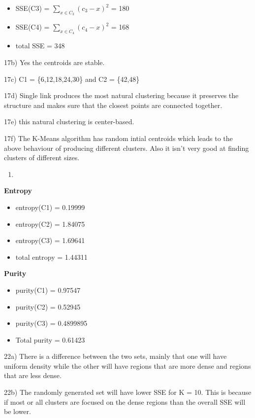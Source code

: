 \documentclass[11pt]{article}
\begin{document}
\begin{itemize}
\item
  SSE(C3) = \(\sum_{x\in C_3} (c_3 - x)^2\) = 180
\item
  SSE(C4) = \(\sum_{x\in C_4} (c_4 - x)^2\) = 168
\item
  total SSE = 348
\end{itemize}

17b) Yes the centroids are stable.

17c) C1 = \{6,12,18,24,30\} and C2 = \{42,48\}

17d) Single link produces the most natural clustering because it
preserves the structure and makes sure that the closest points are
connected together.

17e) this natural clustering is center-based.

17f) The K-Means algorithm has random intial centroids which leads to
the above behaviour of producing different clusters. Also it isn't very
good at finding clusters of different sizes.

\begin{enumerate}
\def\labelenumi{\arabic{enumi})}
\setcounter{enumi}{20}
\item
\end{enumerate}

\textbf{Entropy}

\begin{itemize}
\item
  entropy(C1) = 0.19999
\item
  entropy(C2) = 1.84075
\item
  entropy(C3) = 1.69641
\item
  total entropy = 1.44311
\end{itemize}

\textbf{Purity}

\begin{itemize}
\item
  purity(C1) = 0.97547
\item
  purity(C2) = 0.52945
\item
  purity(C3) = 0.4899895
\item
  Total purity = 0.61423
\end{itemize}

22a) There is a difference between the two sets, mainly that one will
have uniform density while the other will have regions that are more
dense and regions that are less dense.

22b) The randomly generated set will have lower SSE for K = 10. This is
because if most or all clusters are focused on the dense regions than
the overall SSE will be lower.
\end{document}
